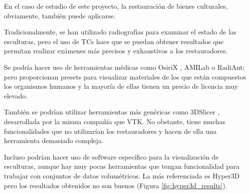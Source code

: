 En el caso de estudio de este proyecto, la restauración de bienes culturales, obviamente, también puede aplicarse.

Tradicionalmente, se han utilizado radiografías para examinar el estado de las esculturas, pero el uso de TCs hace que se puedan obtener resultados que permitan realizar exámenes más precisos y exhaustivos a los restauradores.

Se podría hacer uso de herramientas médicas como OsiriX \cite{osirix}, AMILab \cite{amilab} o RadiAnt; pero proporcionan presets para visualizar materiales de los que están compuestos los organismos humanos y la mayoría de ellas tienen un precio de licencia muy elevado.

También se podrían utilizar herramientas más genéricas como 3DSlicer \cite{slicer}, desarrollada por la misma compañía que VTK. No obstante, tiene muchas funcionalidades que no utilizarían los restauradores y hacen de ella una herramienta demasiado compleja.

Incluso podrían hacer uso de software específico para la visualización de esculturas, aunque hay muy pocas herramientas que tengan funcionalidad para trabajar con conjuntos de datos volumétricos. La más referenciada es Hyper3D \cite{hyper3d} pero los resultados obtenidos no son buenos (Figura \ref{fig:hyper3d_results}).

